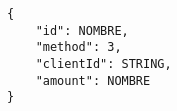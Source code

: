 \begin{lstlisting}
{
	"id": NOMBRE,
	"method": 3,
	"clientId": STRING, 
	"amount": NOMBRE
}
\end{lstlisting}

